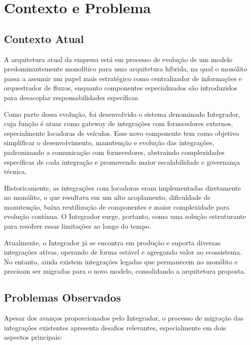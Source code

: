 \section{Contexto e Problema}

\subsection{Contexto Atual}

A arquitetura atual da empresa está em processo de evolução de um modelo predominantemente monolítico para uma arquitetura híbrida, na qual o monólito passa a assumir um papel mais estratégico como centralizador de informações e orquestrador de fluxos, enquanto componentes especializados são introduzidos para desacoplar responsabilidades específicas.

Como parte dessa evolução, foi desenvolvido o sistema denominado Integrador, cuja função é atuar como gateway de integrações com fornecedores externos, especialmente locadoras de veículos. Esse novo componente tem como objetivo simplificar o desenvolvimento, manutenção e evolução das integrações, padronizando a comunicação com fornecedores, abstraindo complexidades específicas de cada integração e promovendo maior escalabilidade e governança técnica.

Historicamente, as integrações com locadoras eram implementadas diretamente no monólito, o que resultava em um alto acoplamento, dificuldade de manutenção, baixa reutilização de componentes e maior complexidade para evolução contínua. O Integrador surge, portanto, como uma solução estruturante para resolver essas limitações ao longo do tempo.

Atualmente, o Integrador já se encontra em produção e suporta diversas integrações ativas, operando de forma estável e agregando valor ao ecossistema. No entanto, ainda existem integrações legadas que permanecem no monólito e precisam ser migradas para o novo modelo, consolidando a arquitetura proposta.

\subsection{Problemas Observados}

Apesar dos avanços proporcionados pelo Integrador, o processo de migração das integrações existentes apresenta desafios relevantes, especialmente em dois aspectos principais:

